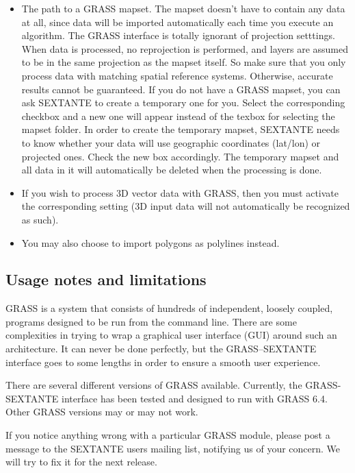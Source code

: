 \begin{itemize} 
  \item The path to a GRASS mapset. The mapset doesn't have to contain any data at all, since data will be imported automatically each time you execute an algorithm. The GRASS interface is totally ignorant of projection setttings. When data is processed, no reprojection is performed, and layers are assumed to be in the same projection as the mapset itself. So make sure that you only process data with matching spatial reference systems. Otherwise, accurate results cannot be guaranteed.
  If you do not have a GRASS mapset, you can ask SEXTANTE to create a temporary one for you. Select the corresponding checkbox and a new one will appear instead of the texbox for selecting the mapset folder. In order to create the temporary mapset, SEXTANTE needs to know whether your data will use geographic coordinates (lat/lon) or projected ones. Check the new box accordingly. The temporary mapset and all data in it will automatically be deleted when the processing is done.
  \item If you wish to process 3D vector data with GRASS, then you must activate the corresponding setting (3D input data will not automatically be recognized as such). 
  \item You may also choose to import polygons as polylines instead. 
\end{itemize}


\subsection{Usage notes and limitations}

GRASS is a system that consists of hundreds of independent, loosely coupled, programs designed to be run from the command line. There are some complexities in trying to wrap a graphical user interface (GUI) around such an architecture. It can never be done perfectly, but the GRASS--SEXTANTE interface goes to some lengths in order to ensure a smooth user experience.

There are several different versions of GRASS available. Currently, the GRASS-SEXTANTE interface has been tested and designed to run with GRASS 6.4. Other GRASS versions may or may not work.

If you notice anything wrong with a particular GRASS module, please post a message to the SEXTANTE users mailing list, notifying us of your concern. We will try to fix it for the next release.

